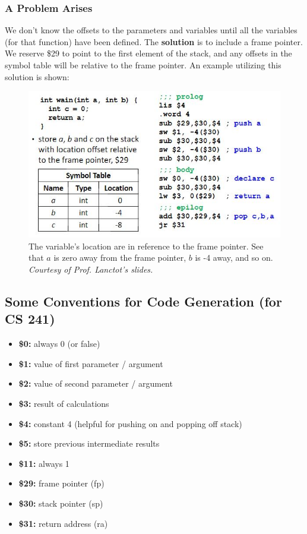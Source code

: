 \documentclass{report}
\begin{document}
\subsubsection{A Problem Arises}
We don't know the offsets to the parameters and variables until all the variables (for that function) have been defined.\newpage
The \textbf{solution} is to include a frame pointer. We reserve \$29 to point to the first element of the stack, and any offsets in the symbol table will be relative to the frame pointer. An example utilizing this solution is shown:
\begin{figure}[ht]
\begin{center}
\includegraphics[scale=0.6]{symb2.jpg}
\end{center}
\caption{The variable's location are in reference to the frame pointer. See that $a$ is zero away from the frame pointer, $b$ is -4 away, and so on. \textit{Courtesy of Prof. Lanctot's slides.}}
\end{figure}
\subsection{Some Conventions for Code Generation (for CS 241)}
\begin{itemize}
\item \textbf{\$0:} always 0 (or false)
\item \textbf{\$1:} value of first parameter / argument
\item \textbf{\$2:} value of second parameter / argument
\item \textbf{\$3:} result of calculations
\item \textbf{\$4:} constant 4 (helpful for pushing on and popping off stack)
\item \textbf{\$5:} store previous intermediate results
\item \textbf{\$11:} always 1
\item \textbf{\$29:} frame pointer (fp)
\item \textbf{\$30:} stack pointer (sp)
\item \textbf{\$31:} return address (ra)
\end{itemize}
\end{document}
